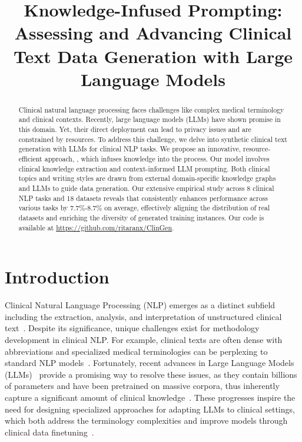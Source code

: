 \title{Knowledge-Infused Prompting: Assessing and Advancing Clinical Text Data Generation with Large Language Models}



\maketitle
\begin{abstract}
Clinical natural language processing faces challenges like complex medical terminology and clinical contexts.
Recently, large language models (LLMs) have shown promise in this domain. Yet, their direct deployment can lead to privacy issues and are constrained by resources. 
To address this challenge, we delve into synthetic clinical text generation with LLMs for clinical NLP tasks. 
We propose an innovative, resource-efficient approach, {\ours}, which infuses knowledge into the process. Our model involves clinical knowledge extraction and context-informed LLM prompting. 
Both clinical topics and writing styles are drawn from external domain-specific knowledge graphs and LLMs to guide data generation. 
Our extensive empirical study across 8 clinical NLP tasks and 18 datasets reveals that {\ours} consistently enhances performance across various tasks by 7.7\%-8.7\% on average, effectively aligning the distribution of real datasets and  enriching the diversity of generated training instances. 
Our code is available at \url{https://github.com/ritaranx/ClinGen}.
\end{abstract}

\vspace{-1ex}
\section{Introduction}
\label{sec:intro}
Clinical Natural Language Processing (NLP) emerges as a distinct subfield including the extraction, analysis, and interpretation of unstructured clinical text~\citep{wornow2023shaky}.  
Despite its significance, unique challenges exist for methodology development in clinical NLP. For example, clinical texts are often dense with abbreviations and specialized medical terminologies can be perplexing to standard NLP models~\citep{lee2023ai}. 
Fortunately, recent advances in Large Language Models (LLMs)~\citep{brown2020language,chung2022scaling,ouyang2022training,chatgpt,gpt4} provide a promising way to resolve these issues, as they contain billions of parameters and have been pretrained on massive corpora, thus inherently capture a significant amount of clinical knowledge~\citep{agrawal2022large,singhal2022large}.  
These progresses inspire the need for designing specialized approaches for adapting LLMs to clinical settings, which both address the terminology complexities and improve models through clinical data finetuning~\citep{tu2023towards,liu2023utility}.

